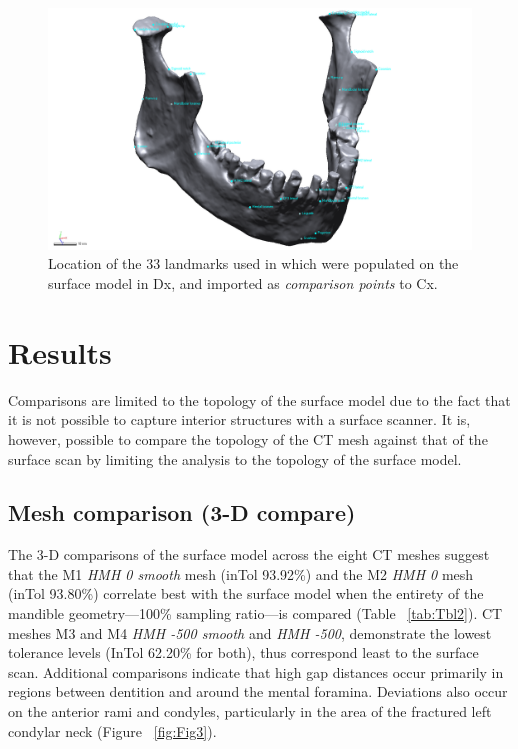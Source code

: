 \documentclass[review]{elsarticle}
\begin{document}
\begin{figure}[ht]\centering
\includegraphics[width=\linewidth]{Fig4}
\caption{Location of the 33 landmarks used in \citet[Supplementary Information]{RN11477} which were populated on the surface model in Dx, and imported as \textit{comparison points} to Cx.}
\label{fig:Fig4}
\end{figure}

\section{Results}

Comparisons are limited to the topology of the surface model due to the fact that it is not possible to capture interior structures with a surface scanner. It is, however, possible to compare the topology of the CT mesh against that of the surface scan by limiting the analysis to the topology of the surface model. 

\subsection{Mesh comparison (3-D compare)}

The 3-D comparisons of the surface model across the eight CT meshes suggest that the M1 \textit{HMH 0 smooth} mesh (inTol 93.92\%) and the M2 \textit{HMH 0} mesh (inTol 93.80\%) correlate best with the surface model when the entirety of the mandible geometry---100\% sampling ratio---is compared (Table ~\ref{tab:Tbl2}). CT meshes M3 and M4 \textit{HMH -500 smooth} and \textit{HMH -500}, demonstrate the lowest tolerance levels (InTol 62.20\% for both), thus correspond least to the surface scan. Additional comparisons indicate that high gap distances occur primarily in regions between dentition and around the mental foramina. Deviations also occur on the anterior rami and condyles, particularly in the area of the fractured left condylar neck (Figure ~\ref{fig:Fig3}). 
\end{document}
